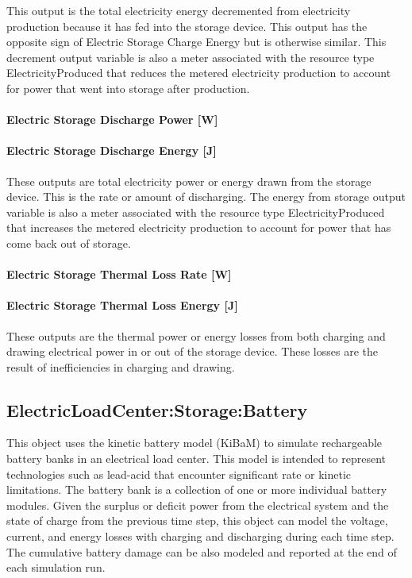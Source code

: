 This output is the total electricity energy decremented from electricity production because it has fed into the storage device. This output has the opposite sign of Electric Storage Charge Energy but is otherwise similar. This decrement output variable is also a meter associated with the resource type ElectricityProduced that reduces the metered electricity production to account for power that went into storage after production.

\paragraph{Electric Storage Discharge Power {[}W{]}}\label{electric-storage-discharge-power-w}

\paragraph{Electric Storage Discharge Energy {[}J{]}}\label{electric-storage-discharge-energy-j}

These outputs are total electricity power or energy drawn from the storage device. This is the rate or amount of discharging. The energy from storage output variable is also a meter associated with the resource type ElectricityProduced that increases the metered electricity production to account for power that has come back out of storage.

\paragraph{Electric Storage Thermal Loss Rate {[}W{]}}\label{electric-storage-thermal-loss-rate-w}

\paragraph{Electric Storage Thermal Loss Energy {[}J{]}}\label{electric-storage-thermal-loss-energy-j}

These outputs are the thermal power or energy losses from both charging and drawing electrical power in or out of the storage device. These losses are the result of inefficiencies in charging and drawing.

\subsection{ElectricLoadCenter:Storage:Battery}\label{electricloadcenterstorage-battery}

This object uses the kinetic battery model (KiBaM) to simulate rechargeable battery banks in an electrical load center. This model is intended to represent technologies such as lead-acid that encounter significant rate or kinetic limitations. The battery bank is a collection of one or more individual battery modules. Given the surplus or deficit power from the electrical system and the state of charge from the previous time step, this object can model the voltage, current, and energy losses with charging and discharging during each time step. The cumulative battery damage can be also modeled and reported at the end of each simulation run.

